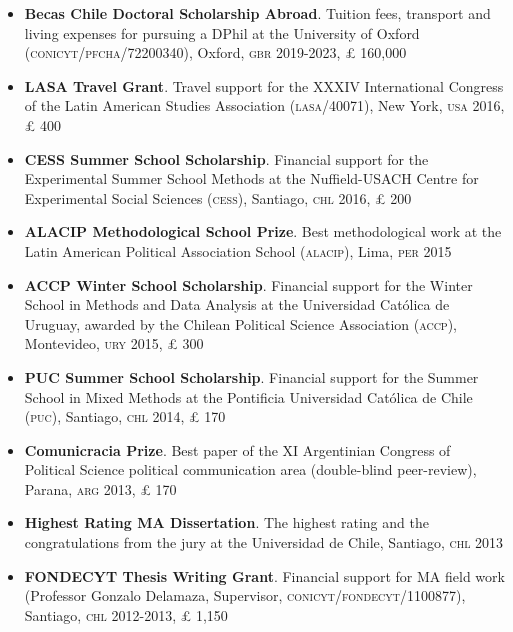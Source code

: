 \documentclass[letterpaper,margin]{res}
\begin{document}
\begin{resume}
\begin{itemize}
\item{\small {\bfseries Becas Chile Doctoral Scholarship Abroad}. Tuition fees, transport and living expenses for pursuing a DPhil at the University of Oxford ({\scshape conicyt/pfcha}/72200340), Oxford, {\scshape gbr} 2019-2023, {\pounds} 160,000}
\item{\small {\bfseries LASA Travel Grant}. Travel support for the XXXIV International Congress of the Latin American Studies Association ({\scshape lasa}/40071), New York, {\scshape usa} 2016, {\pounds} 400}
\item{\small {\bfseries CESS Summer School Scholarship}. Financial support for the Experimental Summer School Methods at the Nuffield-USACH Centre for Experimental Social Sciences ({\scshape cess}), Santiago, {\scshape chl} 2016, {\pounds} 200}
\item {\small {\bfseries ALACIP Methodological School Prize}. Best methodological work at the Latin American Political Association School ({\scshape alacip}), Lima, {\scshape per} 2015}
\item{\small {\bfseries ACCP Winter School Scholarship}. Financial support for the Winter School in Methods and Data Analysis at the Universidad Cat\'olica de Uruguay, awarded by the Chilean Political Science Association ({\scshape accp}), Montevideo, {\scshape ury} 2015, {\pounds} 300}
\item{\small {\bfseries PUC Summer School Scholarship}. Financial support for the Summer School in Mixed Methods at the Pontificia Universidad Cat\'olica de Chile ({\scshape puc}), Santiago, {\scshape chl} 2014, {\pounds} 170}
\item{\small {\bfseries Comunicracia Prize}. Best paper of the XI Argentinian Congress of Political Science political communication area (double-blind peer-review), Parana, {\scshape arg} 2013, {\pounds} 170}
\item{\small {\bfseries Highest Rating MA Dissertation}. The highest rating and the congratulations from the jury at the Universidad de Chile, Santiago, {\scshape chl} 2013}
\item{\small {\bfseries FONDECYT Thesis Writing Grant}. Financial support for MA field work (Professor Gonzalo Delamaza, Supervisor, {\scshape conicyt/fondecyt}/1100877), Santiago, {\scshape chl} 2012-2013, {\pounds} 1,150} %
\end{itemize}


\end{resume}
\end{document}

